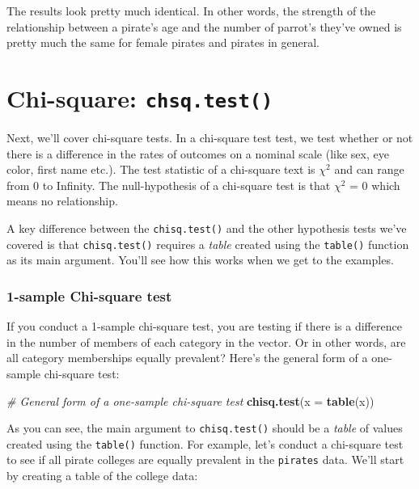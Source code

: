 \documentclass[]{book}
\newenvironment{Shaded}{\begin{snugshade}}{\end{snugshade}}
\newcommand{\KeywordTok}[1]{\textcolor[rgb]{0.13,0.29,0.53}{\textbf{#1}}}
\newcommand{\DataTypeTok}[1]{\textcolor[rgb]{0.13,0.29,0.53}{#1}}
\newcommand{\CommentTok}[1]{\textcolor[rgb]{0.56,0.35,0.01}{\textit{#1}}}
\newcommand{\NormalTok}[1]{#1}
\theoremstyle{definition}
\theoremstyle{definition}
\theoremstyle{remark}
\begin{document}
The results look pretty much identical. In other words, the strength of
the relationship between a pirate's age and the number of parrot's
they've owned is pretty much the same for female pirates and pirates in
general.

\section{\texorpdfstring{Chi-square:
\texttt{chsq.test()}}{Chi-square: chsq.test()}}\label{chi-square-chsq.test}

Next, we'll cover chi-square tests. In a chi-square test test, we test
whether or not there is a difference in the rates of outcomes on a
nominal scale (like sex, eye color, first name etc.). The test statistic
of a chi-square text is \(\chi^2\) and can range from 0 to Infinity. The
null-hypothesis of a chi-square test is that \(\chi^2\) = 0 which means
no relationship.

A key difference between the \texttt{chisq.test()} and the other
hypothesis tests we've covered is that \texttt{chisq.test()} requires a
\emph{table} created using the \texttt{table()} function as its main
argument. You'll see how this works when we get to the examples.

\subsubsection{1-sample Chi-square test}\label{sample-chi-square-test}

If you conduct a 1-sample chi-square test, you are testing if there is a
difference in the number of members of each category in the vector. Or
in other words, are all category memberships equally prevalent? Here's
the general form of a one-sample chi-square test:

\begin{Shaded}
\begin{Highlighting}[]
\CommentTok{# General form of a one-sample chi-square test}
\KeywordTok{chisq.test}\NormalTok{(}\DataTypeTok{x =} \KeywordTok{table}\NormalTok{(x))}
\end{Highlighting}
\end{Shaded}

As you can see, the main argument to \texttt{chisq.test()} should be a
\emph{table} of values created using the \texttt{table()} function. For
example, let's conduct a chi-square test to see if all pirate colleges
are equally prevalent in the \texttt{pirates} data. We'll start by
creating a table of the college data:
\end{document}

